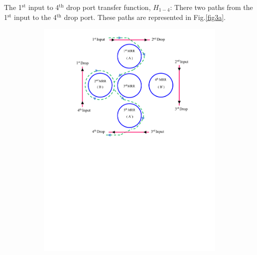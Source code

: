 \documentclass{osa-article}
\begin{document}
The 1$^{\text{st}}$ input to 4$^{\text{th}}$ drop port transfer function, $H_{1-4}$: 
There two paths from the 1$^{\text{st}}$ input to the 4$^{\text{th}}$ drop port. These paths are represented in Fig.\ref{fig3a}.

\begin{figure}[h!]
  \centering
    \begin{subfigure}[b]{0.4\linewidth}
    \includegraphics[width=\linewidth]{figs/fig3a_141.pdf}
    \caption{}
  \end{subfigure}
  \begin{subfigure}[b]{0.4\linewidth}

\end{subfigure}
\end{figure}
\end{document}
